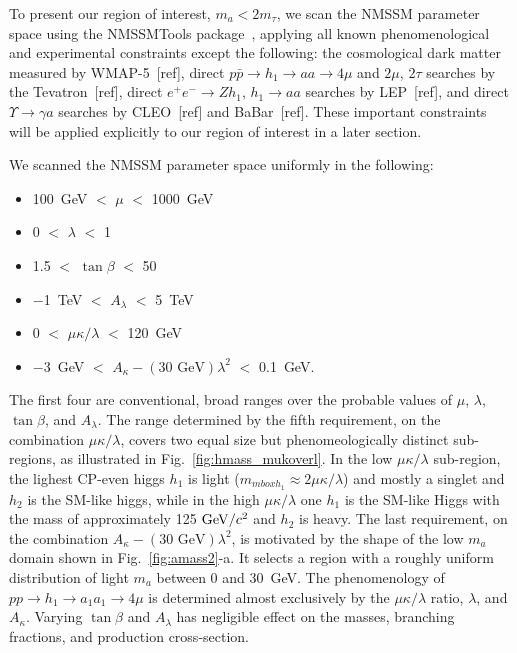 \documentclass[aps,prl,twocolumn,nofootinbib,superscriptaddress]{revtex4}
\begin{document}
To present our region of interest, $m_a < 2m_\tau$, we scan the NMSSM
parameter space using the NMSSMTools
package~\cite{nmssmtools1,nmssmtools2,nmssmtools3}, applying all known
phenomenological and experimental constraints except the following:
the cosmological dark matter measured by WMAP-5~[ref], direct
$p\bar{p} \to h_1 \to aa \to 4\mu$ and $2\mu$, $2\tau$ searches by the
Tevatron~[ref], direct $e^+e^- \to Zh_1$, $h_1 \to aa$ searches by
LEP~[ref], and direct $\Upsilon \to \gamma a$ searches by CLEO~[ref]
and BaBar~[ref].  These important constraints will be applied
explicitly to our region of interest in a later section.

We scanned the NMSSM parameter space uniformly in the following:
\begin{itemize}
\item 100~GeV $<$ $\mu$ $<$ 1000~GeV
\item 0 $<$ $\lambda$ $<$ 1
\item 1.5 $<$ $\tan\beta$ $<$ 50
\item $-$1~TeV $<$ $A_\lambda$ $<$ 5~TeV
\item 0 $<$ $\mu\kappa/\lambda$ $<$ 120~GeV
\item $-$3~GeV $<$ $A_\kappa - (\mbox{30~GeV})\lambda^2$ $<$ 0.1~GeV.
\end{itemize}
The first four are conventional, broad ranges over the probable values
of $\mu$, $\lambda$, $\tan\beta$, and $A_\lambda$.  The range determined
by the fifth requirement, on the combination $\mu\kappa/\lambda$, covers 
two equal size but phenomeologically distinct sub-regions, as illustrated in 
Fig.~\ref{fig:hmass_mukoverl}. In the low $\mu\kappa/\lambda$ sub-region, the 
lighest CP-even higgs $h_1$ is light ($m_{mbox{h_1}} \approx 2 \mu\kappa/\lambda$) 
and mostly a singlet and $h_2$ is the SM-like higgs, while in the high 
$\mu\kappa/\lambda$ one $h_1$ is the SM-like Higgs with the mass of 
approximately 125 $\mbox{${\rm GeV}/c^2$}$ and $h_2$ is heavy. The last requirement, on the 
combination $A_\kappa -(\mbox{30~GeV})\lambda^2$, is motivated by the 
shape of the low $m_a$ domain shown in Fig.~\ref{fig:amass2}-a. It selects 
a region with a roughly uniform distribution of light $m_a$ between 0 and 30~GeV.  
The phenomenology of $pp \to h_1 \to a_1a_1 \to 4\mu$ is determined 
almost exclusively by the $\mu\kappa/\lambda$ ratio, $\lambda$, and 
$A_\kappa$.  Varying $\tan\beta$ and $A_\lambda$ has negligible effect 
on the masses, branching fractions, and production cross-section.
\end{document}
